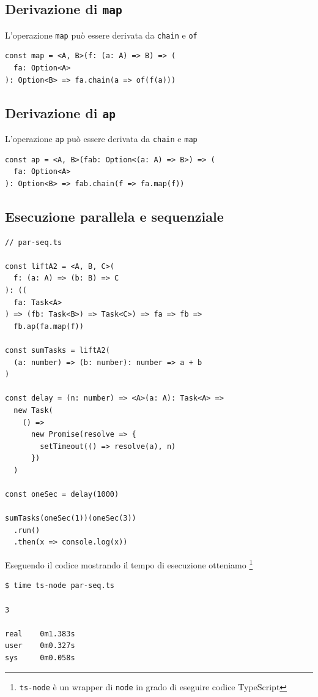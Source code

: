 \documentclass[12pt]{article}
\begin{document}
\subsection{Derivazione di \texttt{map}}

L'operazione \texttt{map} può essere derivata da \texttt{chain} e \texttt{of}

\begin{verbatim}
const map = <A, B>(f: (a: A) => B) => (
  fa: Option<A>
): Option<B> => fa.chain(a => of(f(a)))
\end{verbatim}

\subsection{Derivazione di \texttt{ap}}

L'operazione \texttt{ap} può essere derivata da \texttt{chain} e \texttt{map}

\begin{verbatim}
const ap = <A, B>(fab: Option<(a: A) => B>) => (
  fa: Option<A>
): Option<B> => fab.chain(f => fa.map(f))
\end{verbatim}

\subsection{Esecuzione parallela e sequenziale}

\begin{verbatim}
// par-seq.ts

const liftA2 = <A, B, C>(
  f: (a: A) => (b: B) => C
): ((
  fa: Task<A>
) => (fb: Task<B>) => Task<C>) => fa => fb =>
  fb.ap(fa.map(f))

const sumTasks = liftA2(
  (a: number) => (b: number): number => a + b
)

const delay = (n: number) => <A>(a: A): Task<A> =>
  new Task(
    () =>
      new Promise(resolve => {
        setTimeout(() => resolve(a), n)
      })
  )

const oneSec = delay(1000)

sumTasks(oneSec(1))(oneSec(3))
  .run()
  .then(x => console.log(x))
\end{verbatim}

Eseguendo il codice mostrando il tempo di esecuzione otteniamo
\footnote{\texttt{ts-node} è un wrapper di \texttt{node} in grado di eseguire codice TypeScript}

\begin{verbatim}
$ time ts-node par-seq.ts

3

real    0m1.383s
user    0m0.327s
sys     0m0.058s
\end{verbatim}
\end{document}
